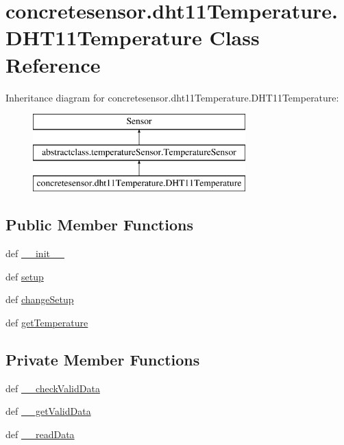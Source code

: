 \hypertarget{classconcretesensor_1_1dht11Temperature_1_1DHT11Temperature}{}\section{concretesensor.\+dht11\+Temperature.\+D\+H\+T11\+Temperature Class Reference}
\label{classconcretesensor_1_1dht11Temperature_1_1DHT11Temperature}
Inheritance diagram for concretesensor.\+dht11\+Temperature.\+D\+H\+T11\+Temperature\+:\begin{figure}[H]
\begin{center}
\leavevmode
\includegraphics[height=3.000000cm]{classconcretesensor_1_1dht11Temperature_1_1DHT11Temperature}
\end{center}
\end{figure}
\subsection*{Public Member Functions}
\begin{DoxyCompactItemize}
\item 
def \hyperlink{classconcretesensor_1_1dht11Temperature_1_1DHT11Temperature_aa47ec7114d961b5ae402147bd8a94b43}{\+\_\+\+\_\+init\+\_\+\+\_\+}
\item 
def \hyperlink{classconcretesensor_1_1dht11Temperature_1_1DHT11Temperature_adb4ab19aaa43483347fd1eba5bb6bbcb}{setup}
\item 
def \hyperlink{classconcretesensor_1_1dht11Temperature_1_1DHT11Temperature_a925fb7815b7ba87b927e4469917308df}{change\+Setup}
\item 
def \hyperlink{classconcretesensor_1_1dht11Temperature_1_1DHT11Temperature_a5266c50fa7e06a80a1ba61b0032704a2}{get\+Temperature}
\end{DoxyCompactItemize}
\subsection*{Private Member Functions}
\begin{DoxyCompactItemize}
\item 
def \hyperlink{classconcretesensor_1_1dht11Temperature_1_1DHT11Temperature_ad4d4bc905951cc4629947b6258a603f3}{\+\_\+\+\_\+check\+Valid\+Data}
\item 
def \hyperlink{classconcretesensor_1_1dht11Temperature_1_1DHT11Temperature_a38248b44581732773dbc4d29d450bd52}{\+\_\+\+\_\+get\+Valid\+Data}
\item 
def \hyperlink{classconcretesensor_1_1dht11Temperature_1_1DHT11Temperature_a653ad11f951c201600bf3fa43e83a610}{\+\_\+\+\_\+read\+Data}
\end{DoxyCompactItemize}
